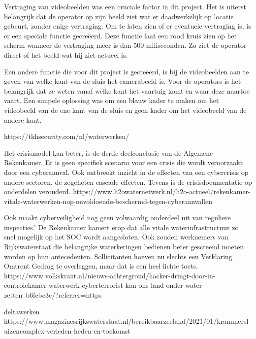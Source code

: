 Vertraging van videobeelden was een cruciale factor in dit project. Het is uiterst belangrijk dat de operator op zijn beeld ziet wat er daadwerkelijk op locatie gebeurt, zonder enige vertraging. Om te laten zien of er eventuele vertraging is, is er een speciale functie gecreëerd. Deze functie laat een rood kruis zien op het scherm wanneer de vertraging meer is dan 500 miliseconden. Zo ziet de operator direct of het beeld wat hij ziet actueel is. 

Een andere functie die voor dit project is gecreëerd, is bij de videobeelden aan te geven van welke kant van de sluis het camerabeeld is. Voor de operators is het belangrijk dat ze weten vanaf welke kant het vaartuig komt en waar deze naartoe vaart. Een simpele oplossing was om een blauw kader te maken om het videobeeld van de ene kant van de sluis en geen kader om het videobeeld van de andere kant. 

https://tkhsecurity.com/nl/waterwerken/

Het crisismodel kan beter, is de derde deelconclusie van de Algemene Rekenkamer. Er is geen specifiek scenario voor een crisis die wordt veroorzaakt door een cyberaanval. Ook ontbreekt inzicht in de effecten van een cybercrisis op andere sectoren, de zogeheten cascade-effecten. Tevens is de crisisdocumentatie op onderdelen verouderd.
https://www.h2owaternetwerk.nl/h2o-actueel/rekenkamer-vitale-waterwerken-nog-onvoldoende-beschermd-tegen-cyberaanvallen


Ook maakt cyberveiligheid nog geen volwaardig onderdeel uit van reguliere inspecties.’ De Rekenkamer hamert erop dat alle vitale waterinfrastructuur zo snel mogelijk op het SOC wordt aangesloten. Ook zouden werknemers van Rijkswaterstaat die belangrijke waterkeringen bedienen beter gescreend moeten worden op hun antecedenten. Sollicitanten hoeven nu slechts een Verklaring Omtrent Gedrag te overleggen, maar dat is een heel lichte toets.
https://www.volkskrant.nl/nieuws-achtergrond/hacker-dringt-door-in-controlekamer-waterwerk-cyberterrorist-kan-ons-land-onder-water-zetten~b6fcbc3c/?referrer=https%

deltawerken
https://www.magazinesrijkswaterstaat.nl/bereikbaarzeeland/2021/01/krammersluizencomplex-verleden-heden-en-toekomst


